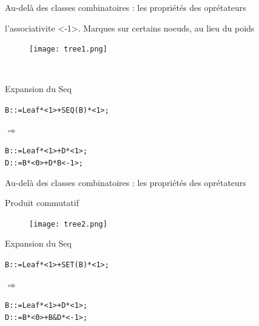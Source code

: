 \documentclass{beamer}
\begin{document}
\begin{frame}{Au-delà des classes combinatoires : les propriétés des oprétateurs}


\begin{block}{l’associativite <-1>. Marques sur certains noeuds, au lieu du poids}
\begin{figure}[h]
  \centering
  \texttt{[image: tree1.png]}
\end{figure}
\
\end{block}
\begin{block}{Expansion du Seq}
\begin{alltt}
B ::= Leaf * <1> + SEQ(B) * <1> ; \\
\end{alltt}
\vspace{0.2cm}
$\Rightarrow$
\begin{minipage}{0.7\textwidth}
\begin{alltt}
B ::= Leaf * <1> + D * <1>; \\
D ::= B * <0> + D * B <-1>;
\end{alltt}
\end{minipage}
\end{block}

\end{frame}



\begin{frame}[fragile]{Au-delà des classes combinatoires : les propriétés des oprétateurs}


\begin{block}{Produit commutatif}
\begin{figure}[h]
  \centering
  \texttt{[image: tree2.png]}
\end{figure}
\end{block}
\begin{block}{Expansion du Seq}
\begin{alltt}
B ::= Leaf * <1> + SET(B) * <1> ; \\
\end{alltt}
\vspace{0.2cm}
$\Rightarrow$
\begin{minipage}{0.7\textwidth}
\begin{alltt}
B ::= Leaf * <1> + D * <1>; \\
D::=B * <0> + B \& D * <-1>;
\end{alltt}
\end{minipage}
\end{block}
\end{frame}
\end{document}
